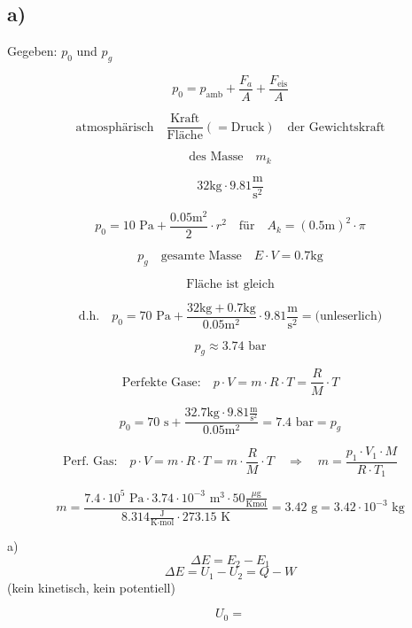 

\subsection*{a)}

Gegeben: $p_0$ und $p_g$

\[
p_0 = p_{\text{amb}} + \frac{F_{a}}{A} + \frac{F_{\text{eis}}}{A}
\]

\[
\text{atmosphärisch} \quad \frac{\text{Kraft}}{\text{Fläche}} (= \text{Druck}) \quad \text{der Gewichtskraft}
\]

\[
\text{des Masse} \quad m_k
\]

\[
32 \text{kg} \cdot 9.81 \frac{\text{m}}{\text{s}^2}
\]

\[
p_0 = 10 \text{ Pa} + \frac{0.05 \text{m}^2}{2} \cdot r^2 \quad \text{für} \quad A_k = (0.5 \text{m})^2 \cdot \pi
\]

\[
p_g \quad \text{gesamte Masse} \quad E \cdot V = 0.7 \text{kg}
\]

\[
\text{Fläche ist gleich}
\]

\[
\text{d.h.} \quad p_0 = 70 \text{ Pa} + \frac{32 \text{kg} + 0.7 \text{kg}}{0.05 \text{m}^2} \cdot 9.81 \frac{\text{m}}{\text{s}^2} =  \text{(unleserlich)}
\]

\[
p_g \approx 3.74 \text{ bar}
\]

\[
\text{Perfekte Gase:} \quad p \cdot V = m \cdot R \cdot T = \frac{R}{M} \cdot T
\]

\[
p_0 = 70 \text{ s} + \frac{32.7 \text{kg} \cdot 9.81 \frac{\text{m}}{\text{s}^2}}{0.05 \text{m}^2} = 7.4 \text{ bar} = p_g
\]

\[
\text{Perf. Gas:} \quad p \cdot V = m \cdot R \cdot T = m \cdot \frac{R}{M} \cdot T \quad \Rightarrow \quad m = \frac{p_1 \cdot V_1 \cdot M}{R \cdot T_1}
\]

\[
m = \frac{7.4 \cdot 10^5 \text{ Pa} \cdot 3.74 \cdot 10^{-3} \text{ m}^3 \cdot 50 \frac{\mu \text{g}}{\text{Kmol}}}{8.314 \frac{\text{J}}{\text{K} \cdot \text{mol}} \cdot 273.15 \text{ K}} = 3.42 \text{ g} = 3.42 \cdot 10^{-3} \text{ kg}
\]

a) 
\[
\Delta E = E_2 - E_1
\]
\[
\Delta E = U_1 - U_2 = Q - W
\]
(kein kinetisch, kein potentiell)

\[
U_0 =
\]